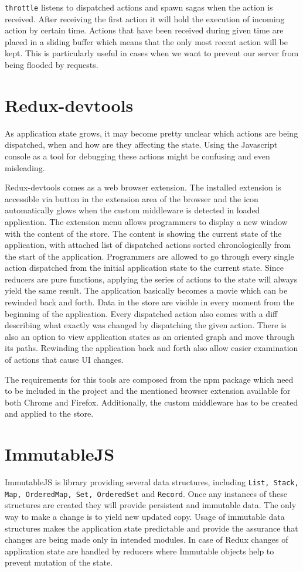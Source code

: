 \texttt{throttle} listens to dispatched actions and spawn sagas when the action is received. After receiving the first action it will hold the execution of incoming action by certain time. Actions that have been received during given time are placed in a sliding buffer which means that the only most recent action will be kept. This is particularly useful in cases when we want to prevent our server from being flooded by requests.

\section{Redux-devtools}
As application state grows, it may become pretty unclear which actions are being dispatched, when and how are they affecting the state. Using the Javascript console as a tool for debugging these actions might be confusing and even misleading.

Redux-devtools comes as a web browser extension. The installed extension is accessible via button in the extension area of the browser and the icon automatically glows when the custom middleware is detected in loaded application. The extension menu allows programmers to display a new window with the content of the store. The content is showing the current state of the application, with attached list of dispatched actions sorted chronologically from the start of the application. Programmers are allowed to go through every single action dispatched from the initial application state to the current state. Since reducers are pure functions, applying the series of actions to the state will always yield the same result. The application basically becomes a movie which can be rewinded back and forth. Data in the store are visible in every moment from the beginning of the application. Every dispatched action also comes with a diff describing what exactly was changed by dispatching the given action. There is also an option to view application states as an oriented graph and move through its paths. Rewinding the application back and forth also allow easier examination of actions that cause UI changes.

The requirements for this tools are composed from the npm package which need to be included in the project and the mentioned browser extension available for both Chrome and Firefox. Additionally, the custom middleware has to be created and applied to the store. 

\section{ImmutableJS}
ImmutableJS \cite{immutable} is library providing several data structures, including \texttt{List, Stack, Map, OrderedMap, Set, OrderedSet} and \texttt{Record}. Once any instances of these structures are created they will provide persistent and immutable data. The only way to make a change is to yield new updated copy. Usage of immutable data structures makes the application state predictable and provide the assurance that changes are being made only in intended modules. In case of Redux changes of application state are handled by reducers where Immutable objects help to prevent mutation of the state.

